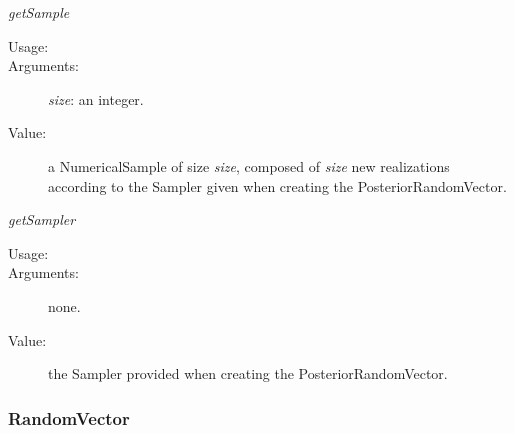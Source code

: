 \begin{description}
\begin{description}
\item \textit{getSample}
\begin{description}
\item[Usage:] \rule{0pt}{1em}
\item[Arguments:] \textit{size}: an integer.\rule{0pt}{1em}
\item[Value:] a NumericalSample of size \textit{size}, composed of \textit{size} new
realizations according to the Sampler given when creating the
PosteriorRandomVector.
\end{description}
\bigskip

\item \textit{getSampler}
\begin{description}
\item[Usage:] \rule{0pt}{1em}
\item[Arguments:] none.\rule{0pt}{1em}
\item[Value:] the Sampler provided when creating the PosteriorRandomVector.
\end{description}

\end{description}

\end{description}


\newpage

\subsubsection{RandomVector}

